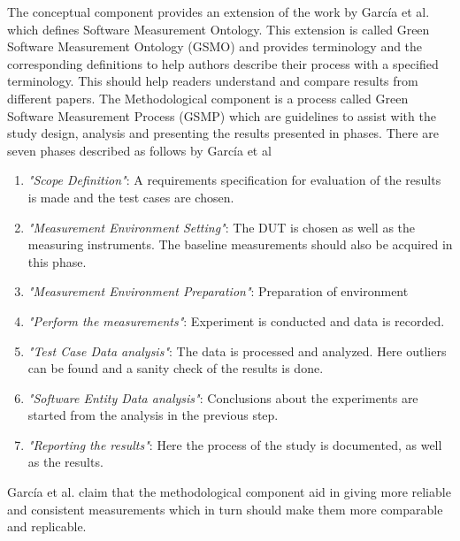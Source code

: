 The conceptual component provides an extension of the work by García et al.\cite{GarciaSMO} which defines Software Measurement Ontology. This extension is called Green Software Measurement Ontology (GSMO) and provides terminology and the corresponding definitions to help authors describe their process with a specified terminology. This should help readers understand and compare results from different papers. The Methodological component is a process called Green Software Measurement Process (GSMP) which are guidelines to assist with the study design, analysis and presenting the results presented in phases. There are seven phases described as follows by García et al\cite*{GarciaFEETINGS}
\begin{enumerate}
    \item \textit{"Scope Definition"}: A requirements specification for evaluation of the results is made and the test cases are chosen.
    \item \textit{"Measurement Environment Setting"}: The DUT is chosen as well as the measuring instruments. The baseline measurements should also be acquired in this phase.
    \item \textit{"Measurement Environment Preparation"}: Preparation of environment
    \item \textit{"Perform the measurements"}: Experiment is conducted and data is recorded. 
    \item \textit{"Test Case Data analysis"}: The data is processed and analyzed. Here outliers can be found and a sanity check of the results is done.
    \item \textit{"Software Entity Data analysis"}: Conclusions about the experiments are started from the analysis in the previous step.
    \item \textit{"Reporting the results"}: Here the process of the study is documented, as well as the results. 
\end{enumerate} 

García et al.\cite*{GarciaFEETINGS} claim that the methodological component aid in giving more reliable and consistent measurements which in turn should make them more comparable and replicable. 

